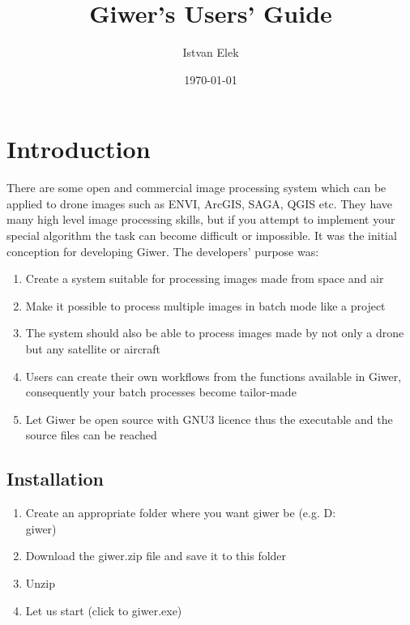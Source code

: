 \documentclass[a4paper,12pt]{article}
\begin{document}
\author{Istvan Elek}

\title{Giwer's Users' Guide}


\date{\today}


\setcounter{tocdepth}{3}
\maketitle
\newpage
\tableofcontents
\newpage


\section{Introduction}

There are some open and commercial image processing system which can be applied to drone images such as ENVI, ArcGIS, SAGA, QGIS etc. They have many high level image processing skills, but if you attempt to implement your special algorithm the task can become difficult or impossible. It was the initial conception for developing Giwer.
The developers' purpose was:

\begin{enumerate}
	\item Create a system suitable for processing images made from space and air
	\item Make it possible to process multiple images in batch mode like a project
	\item The system should also be able to process images made by not only a drone but any satellite or aircraft
	\item Users can create their own workflows from the functions available in Giwer, consequently your batch processes become tailor-made
	\item Let Giwer be open source with GNU3 licence thus the executable and the source files can be reached
\end{enumerate}

\subsection{Installation}

\begin{enumerate}
	\item Create an appropriate folder where you want giwer be (e.g. D:\\giwer)
	\item Download the giwer.zip file and save it to this folder
	\item Unzip
	\item Let us start (click to giwer.exe)
\end{enumerate}
\end{document}
